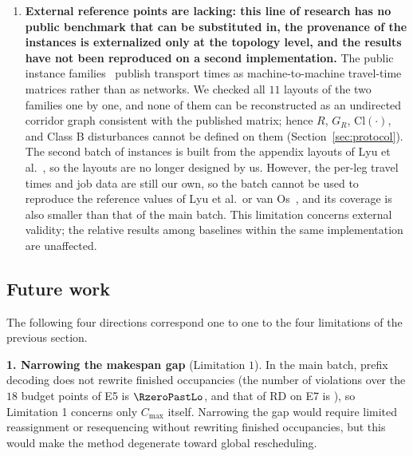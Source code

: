 \begin{enumerate}[leftmargin=1.6em,itemsep=0.35em]
\item \textbf{External reference points are lacking: this line of research has no public benchmark that can be substituted in, the provenance of the instances is externalized only at the topology level,
and the results have not been reproduced on a second implementation.}
The public instance families~\cite{homayouni2021production,bilge1995time} publish transport times as machine-to-machine travel-time matrices rather than as networks. We checked all \(11\) layouts of the two families one by one, and none of them
can be reconstructed as an undirected corridor graph consistent with the published matrix; hence \(R\), \(G_R\), \(\mathrm{Cl}(\cdot)\), and Class B disturbances
cannot be defined on them (Section~\ref{sec:protocol}).
The second batch of instances is built from the appendix layouts of Lyu et al.~\cite{lyu2019approach}, so the layouts are no longer designed by us.
However, the per-leg travel times and job data are still our own, so the batch cannot be used to reproduce the reference values of Lyu et al.\ or van Os~\cite{vanos2026exact},
and its coverage is also smaller than that of the main batch. This limitation concerns external validity; the relative results among baselines within the same implementation are unaffected.
\end{enumerate}

\subsection{Future work}
\label{sec:future}

The following four directions correspond one to one to the four limitations of the previous section.

\textbf{1. Narrowing the makespan gap} (Limitation \(1\)).
In the main batch, prefix decoding does not rewrite finished occupancies (the number of violations over the \(18\) budget points of E5 is \(\RzeroPastLo\),
and that of RD on E7 is \RedecodeBad), so Limitation 1 concerns only \(C_{\max}\) itself.
Narrowing the gap would require limited reassignment or resequencing without rewriting finished occupancies, but this would make the method degenerate toward global rescheduling.

